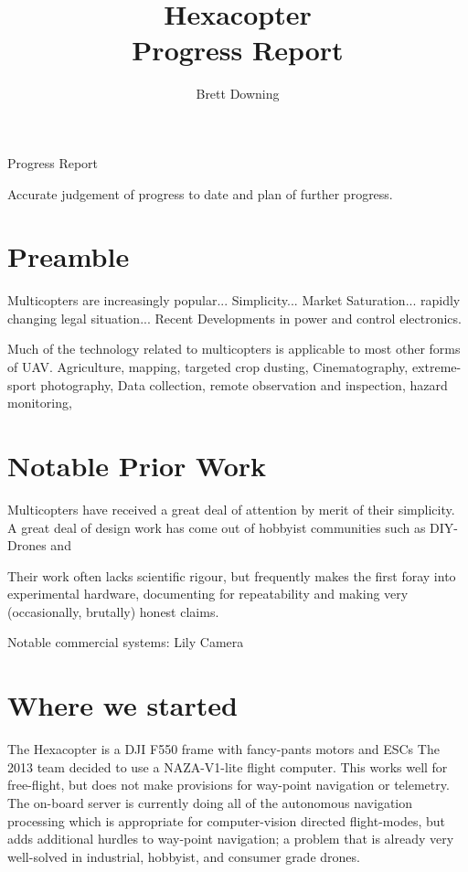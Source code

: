 \documentclass[11pt]{article}
\title{Hexacopter\\
	Progress Report}
\author{Brett Downing}
\date{}
\begin{document}
  \maketitle

  Progress Report
  
  Accurate judgement of progress to date and plan of further progress.

  \section{Preamble}
    Multicopters are increasingly popular... Simplicity... Market Saturation... rapidly changing legal situation... 
    Recent Developments in power and control electronics.

    Much of the technology related to multicopters is applicable to most other forms of UAV.
    Agriculture, mapping, targeted crop dusting, Cinematography, extreme-sport photography, Data collection, remote observation and inspection, hazard monitoring,


  \section{Notable Prior Work}
    Multicopters have received a great deal of attention by merit of their simplicity. A great deal of design work has come out of hobbyist communities such as DIY-Drones and
    
    Their work often lacks scientific rigour, but frequently makes the first foray into experimental hardware, documenting for repeatability and making very (occasionally, brutally) honest claims.

    Notable commercial systems:
    Lily Camera



  \section{Where we started}
    The Hexacopter is a DJI F550 frame with fancy-pants motors and ESCs
    The 2013 team  decided to use a NAZA-V1-lite flight computer.  This works well for free-flight, but does not make provisions for way-point navigation or telemetry.
    The on-board server is currently doing all of the autonomous navigation processing which is appropriate for computer-vision directed flight-modes, but adds additional  hurdles to way-point navigation; a problem that is already very well-solved in industrial, hobbyist, and consumer grade drones.
\end{document}
